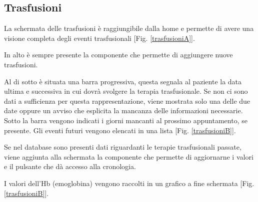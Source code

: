 \documentclass[12pt,a4paper,openright,twoside]{report}
\begin{document}

\subsection{Trasfusioni}
La schermata delle trasfusioni è raggiungibile dalla home e permette di avere una visione completa degli eventi trasfusionali [Fig. \ref{trasfusioniA}].

In alto è sempre presente la componente che permette di aggiungere nuove trasfusioni.

Al di sotto è situata una barra progressiva, questa segnala al paziente la data ultima e successiva in cui dovrà svolgere la terapia trasfusionale. Se non ci sono dati a sufficienza per questa rappresentazione, viene mostrata solo una delle due date oppure un avviso che esplicita la mancanza delle informazioni necessarie. Sotto la barra vengono indicati i giorni mancanti al prossimo appuntamento, se presente. Gli eventi futuri vengono elencati in una lista [Fig. \ref{trasfusioniB}].

Se nel database sono presenti dati riguardanti le terapie trasfusionali passate, viene aggiunta alla schermata la componente che permette di aggiornarne i valori e il pulsante che dà accesso alla cronologia.

I valori dell'Hb (emoglobina) vengono raccolti in un grafico a fine schermata [Fig. \ref{trasfusioniB}]. 
\end{document}
